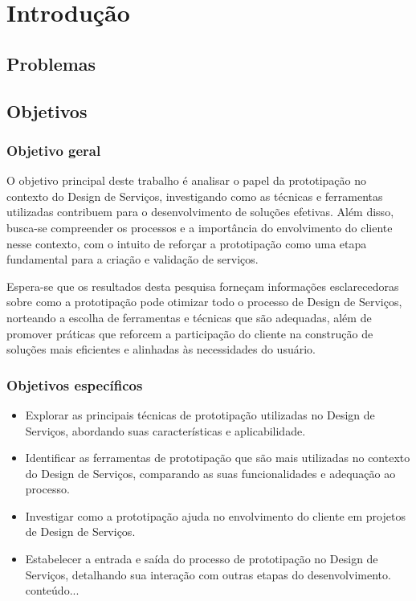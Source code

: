 \chapter[Introdução]{Introdução}



\section {Problemas}

\section {Objetivos}
\subsection{Objetivo geral}

O objetivo principal deste trabalho é analisar o papel da prototipação no contexto do Design de Serviços, investigando como as técnicas e ferramentas utilizadas contribuem para o desenvolvimento de soluções efetivas. Além disso, busca-se compreender os processos e a importância do envolvimento do cliente nesse contexto, com o intuito de reforçar a prototipação como uma etapa fundamental para a criação e validação de serviços.

Espera-se que os resultados desta pesquisa forneçam informações esclarecedoras sobre como a prototipação pode otimizar todo o processo de Design de Serviços, norteando a escolha de ferramentas e técnicas que são adequadas, além de promover práticas que reforcem a participação do cliente na construção de soluções mais eficientes e alinhadas às necessidades do usuário. 

\subsection{Objetivos específicos}

\begin{itemize}
	\item Explorar as principais técnicas de prototipação utilizadas no Design de Serviços, abordando suas características e aplicabilidade.
	
	\item Identificar as ferramentas de prototipação que são mais utilizadas no contexto do Design de Serviços, comparando as suas funcionalidades e adequação ao processo.
	
	\item Investigar como a prototipação ajuda no envolvimento do cliente em projetos de Design de Serviços.
	
	\item Estabelecer a entrada e saída do processo de prototipação no Design de Serviços, detalhando sua interação com outras etapas do desenvolvimento.
	conteúdo...
\end{itemize}

